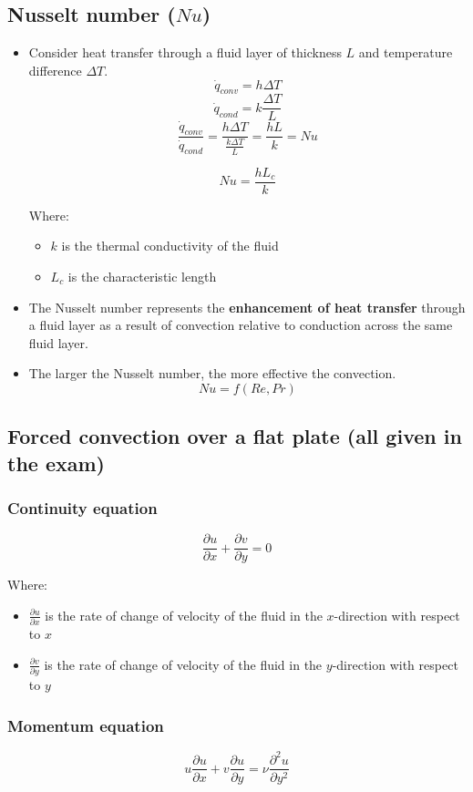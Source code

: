 \documentclass[11pt]{article}
\begin{document}
\subsection{Nusselt number (\(Nu\))}
\label{sec:org9cd266d}
\begin{itemize}
\item Consider heat transfer through a fluid layer of thickness \(L\) and temperature difference \(\Delta T\).
\[\dot{q}_{conv} = h \Delta T\]
\[\dot{q}_{cond} = k \frac{\Delta T}{L}\]
\[\frac{\dot{q}_{conv}}{\dot{q}_{cond}} = \frac{h \Delta T}{\frac{k \Delta T}{L}} = \frac{hL}{k} = Nu\]

\[Nu = \frac{hL_c}{k}\]

Where:
\begin{itemize}
\item \(k\) is the thermal conductivity of the fluid
\item \(L_c\) is the characteristic length
\end{itemize}
\item The Nusselt number represents the \textbf{enhancement of heat transfer} through a fluid layer as a result of convection relative to conduction across the same fluid layer.
\item The larger the Nusselt number, the more effective the convection.
\[Nu = f(Re, Pr)\]
\end{itemize}

\subsection{Forced convection over a flat plate (all given in the exam)}
\label{sec:orgfa648d1}

\subsubsection{Continuity equation}
\label{sec:org62cf420}
\[\frac{\partial u}{\partial x} + \frac{\partial v}{\partial y} = 0\]

Where:
\begin{itemize}
\item \(\frac{\partial u}{\partial x}\) is the rate of change of velocity of the fluid in the \(x\)-direction with respect to \(x\)
\item \(\frac{\partial v}{\partial y}\) is the rate of change of velocity of the fluid in the \(y\)-direction with respect to \(y\)
\end{itemize}

\subsubsection{Momentum equation}
\label{sec:orgc46960b}
\[u \frac{\partial u}{\partial x} + v \frac{\partial u}{\partial y} = \nu \frac{\partial^2 u}{\partial y^2}\]
\end{document}
